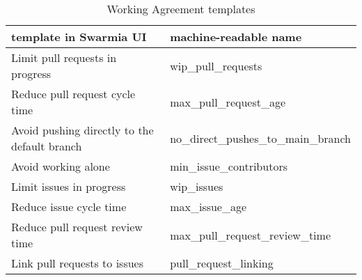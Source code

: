 \begin{table}[ht]
\centering
\begin{tabularx}{\textwidth}{ |X|l| }
\hline
template in Swarmia UI & machine-readable name \\ [0.5ex] 
\hline\hline
Limit pull requests in progress & wip\_pull\_requests \\
Reduce pull request cycle time & max\_pull\_request\_age \\
Avoid pushing directly to the default branch & no\_direct\_pushes\_to\_main\_branch \\
Avoid working alone & min\_issue\_contributors  \\
Limit issues in progress & wip\_issues  \\
Reduce issue cycle time & max\_issue\_age  \\
Reduce pull request review time & max\_pull\_request\_review\_time  \\
Link pull requests to issues & pull\_request\_linking  \\
\hline
\end{tabularx}
\caption{Working Agreement templates}
\label{tab:workingAgreements}
\end{table}



